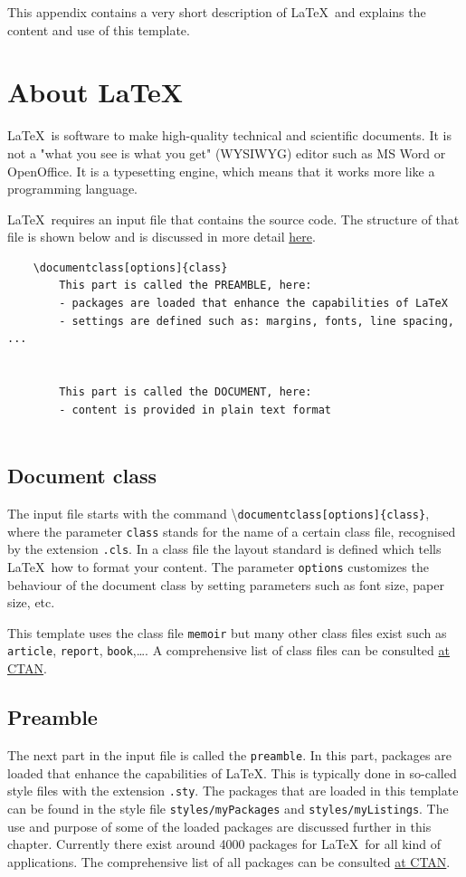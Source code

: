 \label{ch:about}
This appendix contains a very short description of \LaTeX\ and explains the content and use of this template.

\section{About \LaTeX}\label{sec:aboutlatex}
\LaTeX\ is software to make high-quality technical and scientific documents. It is not a "what you see is what you get" (WYSIWYG) editor such as MS Word or OpenOffice. It is a typesetting engine, which means that it works more like a programming language.

\LaTeX\ requires an input file that contains the source code. The structure of that file is shown below and is discussed in more detail \href{https://en.wikibooks.org/wiki/LaTeX/Document_Structure}{here}.

\begin{verbatim}
    \documentclass[options]{class}
        This part is called the PREAMBLE, here:
        - packages are loaded that enhance the capabilities of LaTeX
        - settings are defined such as: margins, fonts, line spacing, ...
        
    
        This part is called the DOCUMENT, here:
        - content is provided in plain text format
    
\end{verbatim}

\subsection{Document class}
The input file starts with the command \textbackslash\verb|documentclass[options]{class}|, where the parameter \texttt{class} stands for the name of a certain class file, recognised by the extension \texttt{.cls}. In a class file the layout standard is defined which tells \LaTeX\ how to format your content. The parameter \texttt{options} customizes the behaviour of the document class by setting parameters such as font size, paper size, etc.

This template uses the class file \texttt{memoir} but many other class files exist such as \texttt{article}, \texttt{report}, \texttt{book},\dots. A comprehensive list of class files can be consulted \href{https://ctan.org/topic/class}{at CTAN}.

\subsection{Preamble}
The next part in the input file is called the \texttt{preamble}. In this part, packages are loaded that enhance the capabilities of \LaTeX. This is typically done in so-called style files with the extension \texttt{.sty}. The packages that are loaded in this template can be found in the style file \texttt{styles/myPackages} and \texttt{styles/myListings}. The use and purpose of some of the loaded packages are discussed further in this chapter. Currently there exist around 4000 packages for \LaTeX\ for all kind of applications. The comprehensive list of all packages can be consulted \href{https://www.ctan.org/pkg/}{at CTAN}.

